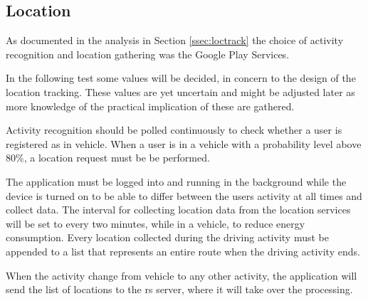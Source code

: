 \subsection{Location}
As documented in the analysis in Section \ref{ssec:loctrack} the choice of activity recognition and location gathering was the Google Play Services.

In the following test some values will be decided, in concern to the design of the location tracking. 
These values are yet uncertain and might be adjusted later as more knowledge of the practical implication of these are gathered. 

Activity recognition should be polled continuously to check whether a user is registered as in vehicle.
When a user is in a vehicle with a probability level above 80\%, a location request must be be performed.

The application must be logged into and running in the background while the device is turned on to be able to differ between the users activity at all times and collect data. 
The interval for collecting location data from the location services will be set to every two minutes, while in a vehicle, to reduce energy consumption. 
Every location collected during the driving activity must be appended to a list that represents an entire route when the driving activity ends.

When the activity change from vehicle to any other activity, the application will send the list of locations to the \gls{rs} server, where it will take over the processing. 